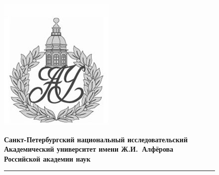 \documentclass[a4paper]{article}
\begin{document}
	\begin{figure}[htb]
		\begin{minipage}[c]{0.12\textwidth}
			\includegraphics[scale=0.25]{AU}
		\end{minipage}
		\hfill
		\begin{minipage}[t]{0.9\textwidth}
			{\Large\bfseries Санкт-Петербургский национальный исследовательский Академический университет имени Ж.И.~Алфёрова\\Российской академии наук}
		\end{minipage}
		\rule{164mm}{0.3mm}
	\end{figure}
	
\end{document}

